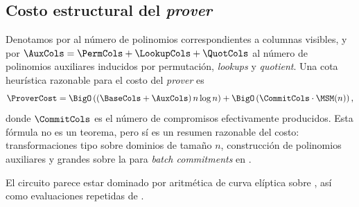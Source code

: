 \subsection{Costo estructural del \textit{prover}}

Denotamos por \BaseCols al número de polinomios correspondientes a columnas visibles, y por $\AuxCols = \PermCols + \LookupCols + \QuotCols$ al número de polinomios auxiliares inducidos por permutación, \textit{lookups} y \textit{quotient}. Una cota heurística razonable para el costo del \textit{prover} es
$$\ProverCost = \BigO\left((\BaseCols + \AuxCols) \, n \log n\right) +  \BigO\left(\CommitCols \cdot \MSM(n)\right),$$
donde $\CommitCols$ es el número de compromisos \KZG efectivamente producidos. Esta fórmula no es un teorema, pero sí es un resumen razonable del costo: transformaciones tipo \FFT sobre dominios de tamaño $n$, construcción de polinomios auxiliares y \MSM grandes sobre la \SRS para \textit{batch commitments} en \KZG.

El circuito \MidnightSTMCircuit parece estar dominado por aritmética de curva elíptica sobre \Jubjub, así como evaluaciones repetidas de \PoseidonHash.
